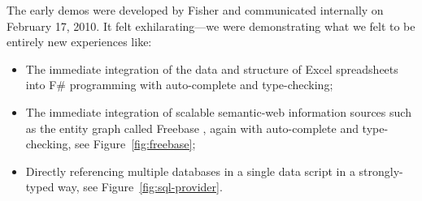 \documentclass[acmsmall,screen]{acmart}
\begin{document}
The early demos were developed by Fisher and communicated internally on February 17, 2010. It felt exhilarating---we were demonstrating
what we felt to be entirely new experiences like:

\begin{itemize}
\item The immediate integration of the data and structure of Excel spreadsheets into F\# programming with auto-complete and type-checking;
\item The immediate integration of scalable semantic-web information sources such as the entity graph called Freebase \citep{Bollacker2008}, again with auto-complete and type-checking, see Figure~\ref{fig:freebase};
\item Directly referencing multiple databases in a single data script in a strongly-typed way, see Figure~\ref{fig:sql-provider}.
\end{itemize}
\end{document}
